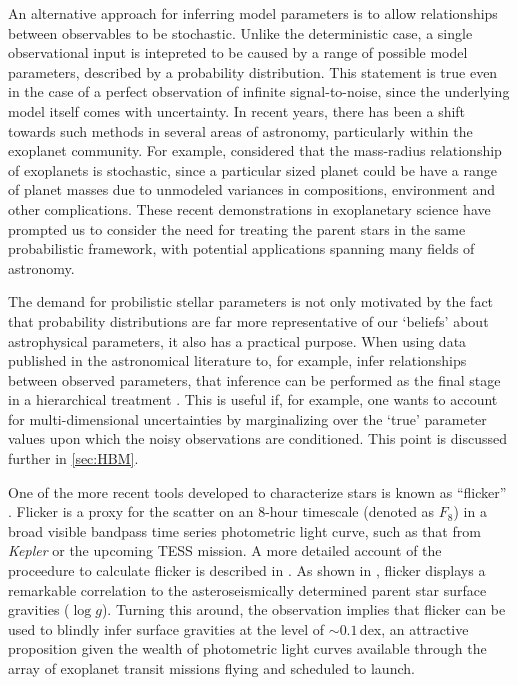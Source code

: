 \documentclass[apjl]{emulateapj}
\newcommand{\logg}{$\log g$}
\begin{document}
An alternative approach for inferring model parameters is to allow
relationships between observables to be stochastic.
Unlike the deterministic case, a single observational input is intepreted to
be caused by a range of possible model parameters, described by a probability
distribution.
This statement is true even in the case of a perfect observation of infinite
signal-to-noise, since the underlying model itself comes with uncertainty.
In recent years, there has been a shift towards such methods in several areas
of astronomy, particularly within the exoplanet community.
For example, \citet{wolfgang:2015} considered that the mass-radius
relationship of exoplanets is stochastic, since a particular sized planet
could be have a range of planet masses due to unmodeled variances in
compositions, environment and other complications.
These recent demonstrations in exoplanetary science have prompted us to
consider the need for treating the parent stars in the same probabilistic
framework, with potential applications spanning many fields of astronomy.

The demand for probilistic stellar parameters is not only motivated by the fact
that probability distributions are far more representative of our `beliefs'
about astrophysical parameters, it also has a practical purpose.
When using data published in the astronomical literature to, for example, infer
relationships between observed parameters, that inference can be performed as
the final stage in a hierarchical treatment
\citep[see, e.g.][]{foreman-mackey:2014}.
This is useful if, for example, one wants to account for multi-dimensional
uncertainties by marginalizing over the `true' parameter values upon which the
noisy observations are conditioned.
This point is discussed further in \textsection\ref{sec:HBM}.



One of the more recent tools developed to characterize stars is known as
``flicker'' \citep{bastien:2013}.
Flicker is a proxy for the scatter on an 8-hour timescale (denoted as $F_8$)
in a broad visible bandpass time series photometric light curve, such as that
from \textit{Kepler} or the upcoming TESS mission. A more detailed account of
the proceedure to calculate flicker is described in \citet{bastien:2013}. As
shown in \citet{bastien:2013}, flicker displays a remarkable correlation to
the asteroseismically determined parent star surface gravities (\logg).
Turning this around, the observation implies that flicker can be used to
blindly infer surface gravities at the level of $\sim0.1$\,dex, an attractive
proposition given the wealth of photometric light curves available through the
array of exoplanet transit missions flying and scheduled to launch.
\end{document}
